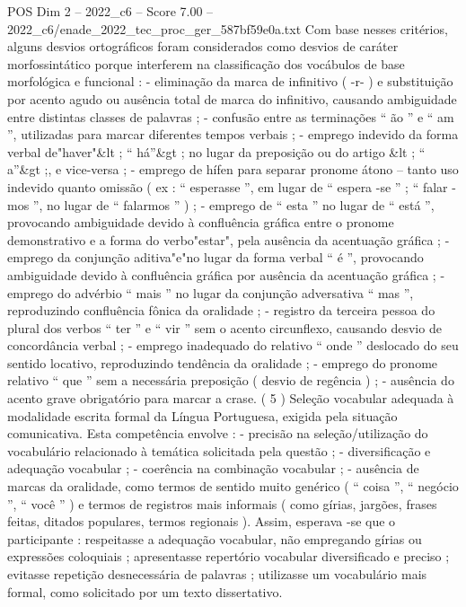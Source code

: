 \begin{textsample}{POS Dim 2 – 2022\_c6 – Score 7.00 – 2022\_c6/enade\_2022\_tec\_proc\_ger\_587bf59e0a.txt}
Com base nesses critérios, alguns desvios ortográficos foram considerados como desvios de caráter morfossintático porque interferem na classificação dos vocábulos de base morfológica e funcional : - eliminação da marca de infinitivo ( -r- ) e substituição por acento agudo ou ausência total de marca do infinitivo, causando ambiguidade entre distintas classes de palavras ; - confusão entre as terminações “ ão ” e “ am ”, utilizadas para marcar diferentes tempos verbais ; - emprego indevido da forma verbal de"haver"\&lt ; “ há”\&gt ; no lugar da preposição ou do artigo \&lt ; “ a”\&gt ;, e vice-versa ; - emprego de hífen para separar pronome átono – tanto uso indevido quanto omissão ( ex : “ esperasse ”, em lugar de “ espera -se ” ; “ falar -mos ”, no lugar de “ falarmos ” ) ; - emprego de “ esta ” no lugar de “ está ”, provocando ambiguidade devido à confluência gráfica entre o pronome demonstrativo e a forma do verbo"estar", pela ausência da acentuação gráfica ; - emprego da conjunção aditiva"e"no lugar da forma verbal “ é ”, provocando ambiguidade devido à confluência gráfica por ausência da acentuação gráfica ; - emprego do advérbio “ mais ” no lugar da conjunção adversativa “ mas ”, reproduzindo confluência fônica da oralidade ; - registro da terceira pessoa do plural dos verbos “ ter ” e “ vir ” sem o acento circunflexo, causando desvio de concordância verbal ; - emprego inadequado do relativo “ onde ” deslocado do seu sentido locativo, reproduzindo tendência da oralidade ; - emprego do pronome relativo “ que ” sem a necessária preposição ( desvio de regência ) ; - ausência do acento grave obrigatório para marcar a crase. ( 5 ) Seleção vocabular adequada à modalidade escrita formal da Língua Portuguesa, exigida pela situação comunicativa.
Esta competência envolve : - precisão na seleção/utilização do vocabulário relacionado à temática solicitada pela questão ; - diversificação e adequação vocabular ; - coerência na combinação vocabular ; - ausência de marcas da oralidade, como termos de sentido muito genérico ( “ coisa ”, “ negócio ”, “ você ” ) e termos de registros mais informais ( como gírias, jargões, frases feitas, ditados populares, termos regionais ).
Assim, esperava -se que o participante : respeitasse a adequação vocabular, não empregando gírias ou expressões coloquiais ; apresentasse repertório vocabular diversificado e preciso ; evitasse repetição desnecessária de palavras ; utilizasse um vocabulário mais formal, como solicitado por um texto dissertativo.

\end{textsample}
